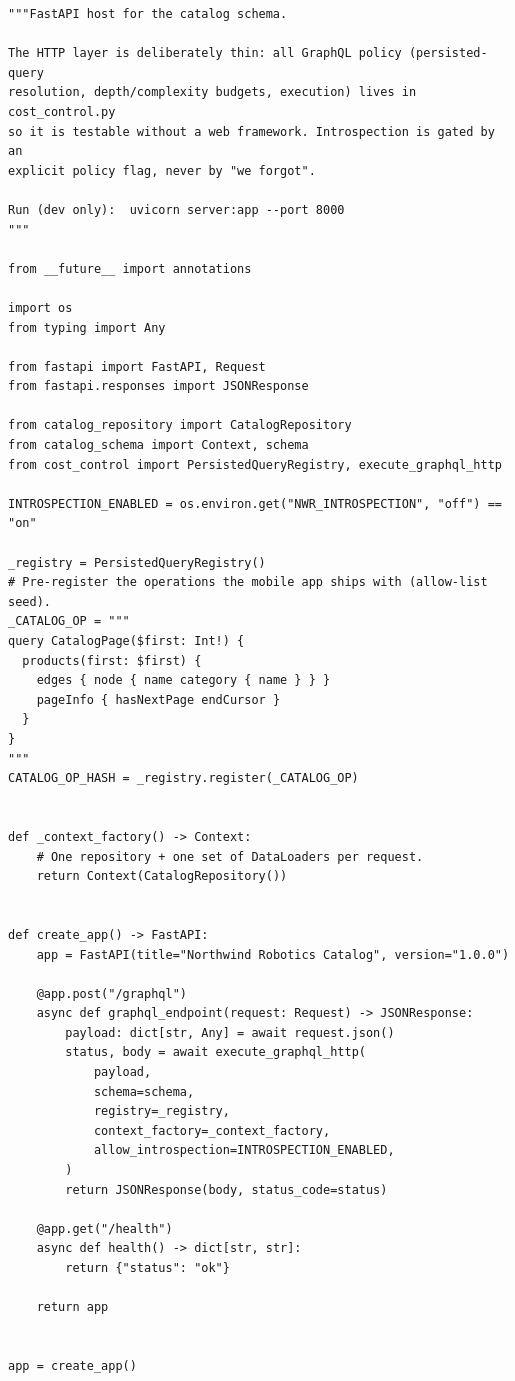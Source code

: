 \begin{verbatim}
"""FastAPI host for the catalog schema.

The HTTP layer is deliberately thin: all GraphQL policy (persisted-query
resolution, depth/complexity budgets, execution) lives in cost_control.py
so it is testable without a web framework. Introspection is gated by an
explicit policy flag, never by "we forgot".

Run (dev only):  uvicorn server:app --port 8000
"""

from __future__ import annotations

import os
from typing import Any

from fastapi import FastAPI, Request
from fastapi.responses import JSONResponse

from catalog_repository import CatalogRepository
from catalog_schema import Context, schema
from cost_control import PersistedQueryRegistry, execute_graphql_http

INTROSPECTION_ENABLED = os.environ.get("NWR_INTROSPECTION", "off") == "on"

_registry = PersistedQueryRegistry()
# Pre-register the operations the mobile app ships with (allow-list seed).
_CATALOG_OP = """
query CatalogPage($first: Int!) {
  products(first: $first) {
    edges { node { name category { name } } }
    pageInfo { hasNextPage endCursor }
  }
}
"""
CATALOG_OP_HASH = _registry.register(_CATALOG_OP)


def _context_factory() -> Context:
    # One repository + one set of DataLoaders per request.
    return Context(CatalogRepository())


def create_app() -> FastAPI:
    app = FastAPI(title="Northwind Robotics Catalog", version="1.0.0")

    @app.post("/graphql")
    async def graphql_endpoint(request: Request) -> JSONResponse:
        payload: dict[str, Any] = await request.json()
        status, body = await execute_graphql_http(
            payload,
            schema=schema,
            registry=_registry,
            context_factory=_context_factory,
            allow_introspection=INTROSPECTION_ENABLED,
        )
        return JSONResponse(body, status_code=status)

    @app.get("/health")
    async def health() -> dict[str, str]:
        return {"status": "ok"}

    return app


app = create_app()
\end{verbatim}

